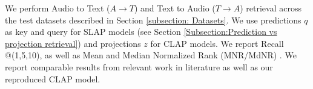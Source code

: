 \documentclass{article}
\newcommand{\redcross}{\textcolor{red}{\ding{55}}} %
\begin{document}
We perform Audio to Text ($A \rightarrow T$) and Text to Audio ($T \rightarrow A$) retrieval across the test datasets described in Section \ref{subsection: Datasets}. We use predictions $q$ as key and query for SLAP models (see Section \ref{Subsection:Prediction vs projection retrieval}) and projections $z$ for CLAP models. We report Recall @(1,5,10), as well as Mean and Median Normalized Rank (MNR/MdNR) \cite{SampleMatch}. We report comparable results from relevant work in literature as well as our reproduced CLAP model.
\end{document}
